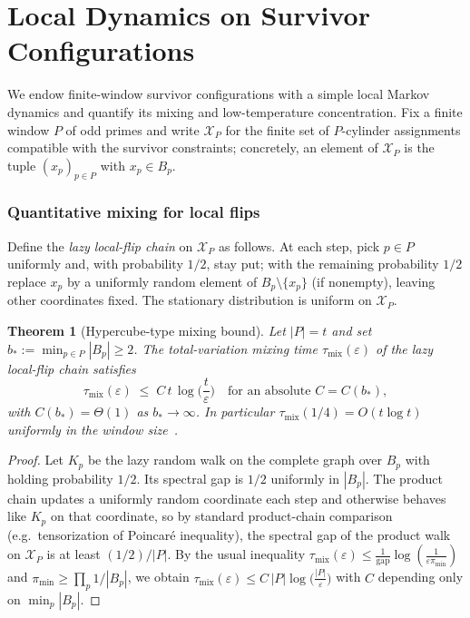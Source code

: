 \documentclass[12pt]{article}
\newtheorem{theorem}{Theorem}[section]
\numberwithin{equation}{section}
\begin{document}
\section{Local Dynamics on Survivor Configurations}\label{sec:dynamics}
We endow finite-window survivor configurations with a simple local Markov dynamics and quantify its mixing and low-temperature concentration. Fix a finite window $P$ of odd primes and write $\mathcal{X}_P$ for the finite set of $P$-cylinder assignments compatible with the survivor constraints; concretely, an element of $\mathcal{X}_P$ is the tuple $(x_p)_{p\in P}$ with $x_p\in B_p$.

\subsubsection{Quantitative mixing for local flips}\label{subsec:B6-mixing}
Define the \emph{lazy local-flip chain} on $\mathscr{X}_P$ as follows. At each step, pick $p\in P$ uniformly and, with probability $1/2$, stay put; with the remaining probability $1/2$ replace $x_p$ by a uniformly random element of $B_p\setminus\{x_p\}$ (if nonempty), leaving other coordinates fixed. The stationary distribution is uniform on $\mathscr{X}_P$.

\begin{theorem}[Hypercube-type mixing bound]\label{thm:mixing}
Let $|P|=t$ and set $b_\ast:=\min_{p\in P}|B_p|\ge 2$. The total-variation mixing time $\tau_{\mathrm{mix}}(\varepsilon)$ of the lazy local-flip chain satisfies
\[
\tau_{\mathrm{mix}}(\varepsilon) \;\le\; C\, t\, \log\Big( \frac{t}{\varepsilon}\Big)\quad\text{for an absolute }C=C(b_\ast),
\]
with $C(b_\ast)=\Theta(1)$ as $b_\ast\to\infty$. In particular $\tau_{\mathrm{mix}}(1/4)=O(t\log t)$ uniformly in the window size~\cite{SpivackUGPFormalization,ugp-lean}.
\end{theorem}

\begin{proof}
Let $K_p$ be the lazy random walk on the complete graph over $B_p$ with holding probability $1/2$. Its spectral gap is $1/2$ uniformly in $|B_p|$. The product chain updates a uniformly random coordinate each step and otherwise behaves like $K_p$ on that coordinate, so by standard product-chain comparison (e.g.\ tensorization of Poincaré inequality), the spectral gap of the product walk on $\mathscr{X}_P$ is at least $(1/2)/|P|$. By the usual inequality $\tau_{\mathrm{mix}}(\varepsilon)\le \frac{1}{\mathrm{gap}}\log(\frac{1}{\varepsilon\pi_{\min}})$ and $\pi_{\min}\ge \prod_p 1/|B_p|$, we obtain $\tau_{\mathrm{mix}}(\varepsilon)\le C\,|P|\log\big(\tfrac{|P|}{\varepsilon}\big)$ with $C$ depending only on $\min_p |B_p|$.
\end{proof}
\end{document}
